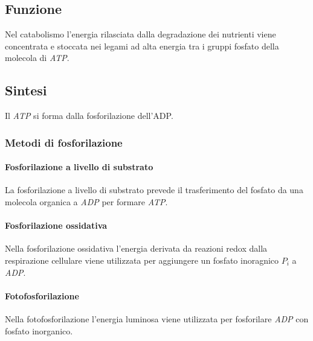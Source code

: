 	\subsection{Funzione}
	Nel catabolismo l'energia rilasciata dalla degradazione dei nutrienti viene concentrata e stoccata nei legami ad alta energia tra i gruppi fosfato della molecola di \emph{ATP}.

	\subsection{Sintesi}
	Il \emph{ATP} si forma dalla fosforilazione dell'ADP.

		\subsubsection{Metodi di fosforilazione}
	
			\paragraph{Fosforilazione a livello di substrato}
			La fosforilazione a livello di substrato prevede il trasferimento del fosfato da una molecola organica a \emph{ADP} per formare \emph{ATP}.

			\paragraph{Fosforilazione ossidativa}
			Nella fosforilazione ossidativa l'energia derivata da reazioni redox dalla respirazione cellulare viene utilizzata per aggiungere un fosfato inoragnico $P_i$ a \emph{ADP}.

			\paragraph{Fotofosforilazione}
			Nella fotofosforilazione l'energia luminosa viene utilizzata per fosforilare \emph{ADP} con fosfato inorganico.

